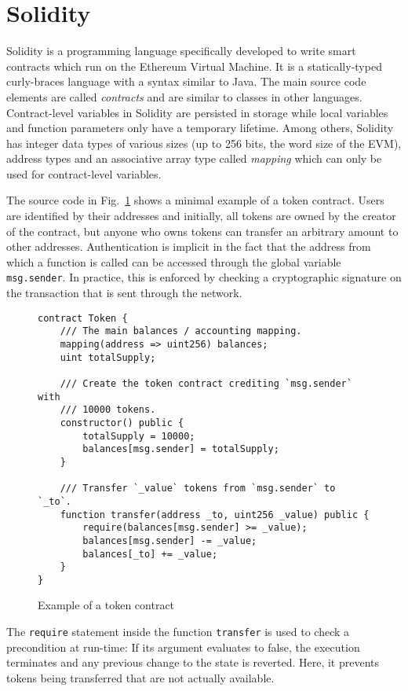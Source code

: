 \section{Solidity}
\label{section:solidity}

Solidity is a programming language specifically developed to write smart contracts
which run on the Ethereum Virtual Machine. It is a statically-typed curly-braces
language with a syntax similar to Java. The main source code elements are
called \emph{contracts} and are similar to classes in other languages.
Contract-level variables in Solidity are persisted in storage while
local variables and function parameters only have a temporary lifetime.
Among others, Solidity has integer data types of various sizes (up to 256 bits,
the word size of the EVM), address types and an associative array
type called \emph{mapping} which can only be used for contract-level variables.

The source code in Fig.~\ref{fig:tokenContract} shows a minimal example of a token contract.
Users are identified by their addresses and initially, all tokens are
owned by the creator of the contract, but
anyone who owns tokens can transfer an arbitrary amount to other addresses.
Authentication is implicit in the fact that the address from which
a function is called can be accessed through the global variable
\texttt{msg.sender}. In practice, this is enforced by checking a
cryptographic signature on the transaction that is sent through the network.

\begin{figure}
\begin{verbatim}
contract Token {
    /// The main balances / accounting mapping.
    mapping(address => uint256) balances;
    uint totalSupply;

    /// Create the token contract crediting `msg.sender` with
    /// 10000 tokens.
    constructor() public {
        totalSupply = 10000;
        balances[msg.sender] = totalSupply;
    }

    /// Transfer `_value` tokens from `msg.sender` to `_to`.
    function transfer(address _to, uint256 _value) public {
        require(balances[msg.sender] >= _value);
        balances[msg.sender] -= _value;
        balances[_to] += _value;
    }
}
\end{verbatim}
\caption{Example of a token contract}
\label{fig:tokenContract}
\end{figure}

The \texttt{require} statement inside the function \texttt{transfer} is used
to check a precondition at run-time: If its argument evaluates to false,
the execution terminates and any previous change to the state is reverted.
Here, it prevents tokens being transferred that are not actually available.


